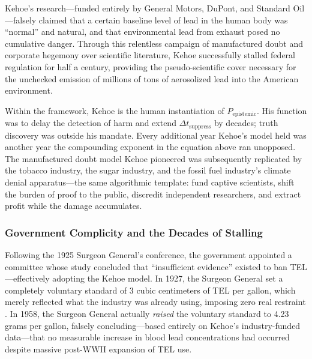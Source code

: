 Kehoe's research---funded entirely by General Motors, DuPont, and Standard Oil---falsely claimed that a certain baseline level of lead in the human body was ``normal'' and natural, and that environmental lead from exhaust posed no cumulative danger. Through this relentless campaign of manufactured doubt and corporate hegemony over scientific literature, Kehoe successfully stalled federal regulation for half a century, providing the pseudo-scientific cover necessary for the unchecked emission of millions of tons of aerosolized lead into the American environment.

Within the framework, Kehoe is the human instantiation of $P_{\text{epistemic}}$. His function was to delay the detection of harm and extend $\Delta t_{\text{suppress}}$ by decades; truth discovery was outside his mandate. Every additional year Kehoe's model held was another year the compounding exponent in the equation above ran unopposed. The manufactured doubt model Kehoe pioneered was subsequently replicated by the tobacco industry, the sugar industry, and the fossil fuel industry's climate denial apparatus---the same algorithmic template: fund captive scientists, shift the burden of proof to the public, discredit independent researchers, and extract profit while the damage accumulates.

\subsubsection{Government Complicity and the Decades of Stalling}

Following the 1925 Surgeon General's conference, the government appointed a committee whose study concluded that ``insufficient evidence'' existed to ban TEL---effectively adopting the Kehoe model. In 1927, the Surgeon General set a completely voluntary standard of 3 cubic centimeters of TEL per gallon, which merely reflected what the industry was already using, imposing zero real restraint \cite{tel_epa_history}. In 1958, the Surgeon General actually \textit{raised} the voluntary standard to 4.23 grams per gallon, falsely concluding---based entirely on Kehoe's industry-funded data---that no measurable increase in blood lead concentrations had occurred despite massive post-WWII expansion of TEL use.

